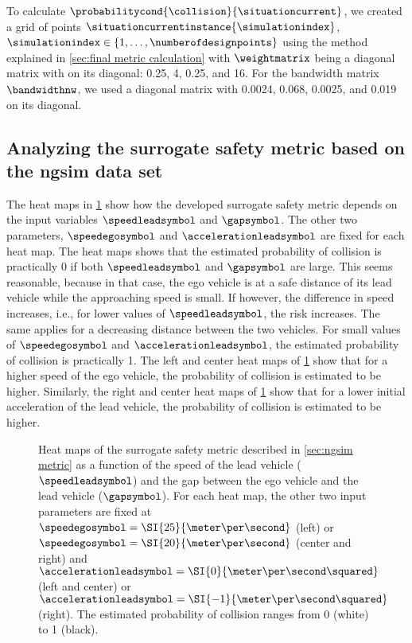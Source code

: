 To calculate $\probabilitycond{\collision}{\situationcurrent}$, we created a grid of points $\situationcurrentinstance{\simulationindex}$, $\simulationindex\in\{1,\ldots,\numberofdesignpoints\}$ using the method explained in \cref{sec:final metric calculation} with $\weightmatrix$ being a diagonal matrix with on its diagonal: 0.25, 4, 0.25, and 16.
For the bandwidth matrix $\bandwidthnw$, we used a diagonal matrix with 0.0024, 0.068, 0.0025, and 0.019 on its diagonal.



\subsection{Analyzing the surrogate safety metric based on the \acs{ngsim} data set}
\label{sec:analyzing ngsim metric}

The heat maps in \cref{fig:heatmaps} show how the developed surrogate safety metric depends on the input variables $\speedleadsymbol$ and $\gapsymbol$. 
The other two parameters, $\speedegosymbol$ and $\accelerationleadsymbol$ are fixed for each heat map.
The heat maps shows that the estimated probability of collision is practically 0 if both $\speedleadsymbol$ and $\gapsymbol$ are large.
This seems reasonable, because in that case, the ego vehicle is at a safe distance of its lead vehicle while the approaching speed is small. 
If however, the difference in speed increases, i.e., for lower values of $\speedleadsymbol$, the risk increases. 
The same applies for a decreasing distance between the two vehicles.
For small values of $\speedegosymbol$ and $\accelerationleadsymbol$, the estimated probability of collision is practically 1.
The left and center heat maps of \cref{fig:heatmaps} show that for a higher speed of the ego vehicle, the probability of collision is estimated to be higher.
Similarly, the right and center heat maps of \cref{fig:heatmaps} show that for a lower initial acceleration of the lead vehicle, the probability of collision is estimated to be higher.

\setlength{\figurewidth}{.35\linewidth}
\setlength{\figureheight}{0.8\figurewidth}
\begin{figure}
	\centering
	
	\caption{Heat maps of the surrogate safety metric described in \cref{sec:ngsim metric} as a function of the speed of the lead vehicle ($\speedleadsymbol$) and the gap between the ego vehicle and the lead vehicle ($\gapsymbol$).
		For each heat map, the other two input parameters are fixed at $\speedegosymbol=\SI{25}{\meter\per\second}$ (left) or $\speedegosymbol=\SI{20}{\meter\per\second}$ (center and right) and $\accelerationleadsymbol=\SI{0}{\meter\per\second\squared}$ (left and center) or $\accelerationleadsymbol=\SI{-1}{\meter\per\second\squared}$ (right).
		The estimated probability of collision ranges from 0 (white) to 1 (black).}
	\label{fig:heatmaps}
\end{figure}



